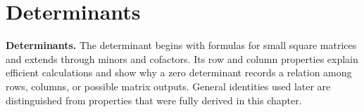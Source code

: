 \chapter{Determinants}








\noindent\textbf{Determinants.} The determinant begins with formulas for small square matrices and extends through minors and cofactors. Its row and column properties explain efficient calculations and show why a zero determinant records a relation among rows, columns, or possible matrix outputs. General identities used later are distinguished from properties that were fully derived in this chapter.


